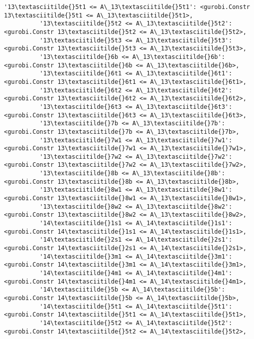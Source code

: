 \documentclass[11pt]{article}
\begin{document}
\begin{Verbatim}[commandchars=\\\{\}]
          '13\textasciitilde{}5t1 <= A\_13\textasciitilde{}5t1': <gurobi.Constr 13\textasciitilde{}5t1 <= A\_13\textasciitilde{}5t1>,
          '13\textasciitilde{}5t2 <= A\_13\textasciitilde{}5t2': <gurobi.Constr 13\textasciitilde{}5t2 <= A\_13\textasciitilde{}5t2>,
          '13\textasciitilde{}5t3 <= A\_13\textasciitilde{}5t3': <gurobi.Constr 13\textasciitilde{}5t3 <= A\_13\textasciitilde{}5t3>,
          '13\textasciitilde{}6b <= A\_13\textasciitilde{}6b': <gurobi.Constr 13\textasciitilde{}6b <= A\_13\textasciitilde{}6b>,
          '13\textasciitilde{}6t1 <= A\_13\textasciitilde{}6t1': <gurobi.Constr 13\textasciitilde{}6t1 <= A\_13\textasciitilde{}6t1>,
          '13\textasciitilde{}6t2 <= A\_13\textasciitilde{}6t2': <gurobi.Constr 13\textasciitilde{}6t2 <= A\_13\textasciitilde{}6t2>,
          '13\textasciitilde{}6t3 <= A\_13\textasciitilde{}6t3': <gurobi.Constr 13\textasciitilde{}6t3 <= A\_13\textasciitilde{}6t3>,
          '13\textasciitilde{}7b <= A\_13\textasciitilde{}7b': <gurobi.Constr 13\textasciitilde{}7b <= A\_13\textasciitilde{}7b>,
          '13\textasciitilde{}7w1 <= A\_13\textasciitilde{}7w1': <gurobi.Constr 13\textasciitilde{}7w1 <= A\_13\textasciitilde{}7w1>,
          '13\textasciitilde{}7w2 <= A\_13\textasciitilde{}7w2': <gurobi.Constr 13\textasciitilde{}7w2 <= A\_13\textasciitilde{}7w2>,
          '13\textasciitilde{}8b <= A\_13\textasciitilde{}8b': <gurobi.Constr 13\textasciitilde{}8b <= A\_13\textasciitilde{}8b>,
          '13\textasciitilde{}8w1 <= A\_13\textasciitilde{}8w1': <gurobi.Constr 13\textasciitilde{}8w1 <= A\_13\textasciitilde{}8w1>,
          '13\textasciitilde{}8w2 <= A\_13\textasciitilde{}8w2': <gurobi.Constr 13\textasciitilde{}8w2 <= A\_13\textasciitilde{}8w2>,
          '14\textasciitilde{}1s1 <= A\_14\textasciitilde{}1s1': <gurobi.Constr 14\textasciitilde{}1s1 <= A\_14\textasciitilde{}1s1>,
          '14\textasciitilde{}2s1 <= A\_14\textasciitilde{}2s1': <gurobi.Constr 14\textasciitilde{}2s1 <= A\_14\textasciitilde{}2s1>,
          '14\textasciitilde{}3m1 <= A\_14\textasciitilde{}3m1': <gurobi.Constr 14\textasciitilde{}3m1 <= A\_14\textasciitilde{}3m1>,
          '14\textasciitilde{}4m1 <= A\_14\textasciitilde{}4m1': <gurobi.Constr 14\textasciitilde{}4m1 <= A\_14\textasciitilde{}4m1>,
          '14\textasciitilde{}5b <= A\_14\textasciitilde{}5b': <gurobi.Constr 14\textasciitilde{}5b <= A\_14\textasciitilde{}5b>,
          '14\textasciitilde{}5t1 <= A\_14\textasciitilde{}5t1': <gurobi.Constr 14\textasciitilde{}5t1 <= A\_14\textasciitilde{}5t1>,
          '14\textasciitilde{}5t2 <= A\_14\textasciitilde{}5t2': <gurobi.Constr 14\textasciitilde{}5t2 <= A\_14\textasciitilde{}5t2>,

\end{Verbatim}
\end{document}
